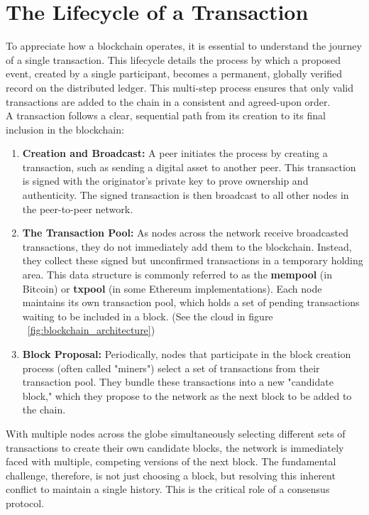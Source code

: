 \documentclass{scrbook}
\begin{document}
\chapter{The Lifecycle of a Transaction}

To appreciate how a blockchain operates, it is essential to understand the journey of a single transaction. This lifecycle details the process by which a proposed event, created by a single participant, becomes a permanent, globally verified record on the distributed ledger. This multi-step process ensures that only valid transactions are added to the chain in a consistent and agreed-upon order. \\


A transaction follows a clear, sequential path from its creation to its final inclusion in the blockchain:

\begin{enumerate}
    \item \textbf{Creation and Broadcast:} A peer initiates the process by creating a transaction, such as sending a digital asset to another peer. This transaction is signed with the originator's private key to prove ownership and authenticity. The signed transaction is then broadcast to all other nodes in the peer-to-peer network.
    
    \item \textbf{The Transaction Pool:} As nodes across the network receive broadcasted transactions, they do not immediately add them to the blockchain. Instead, they collect these signed but unconfirmed transactions in a temporary holding area. This data structure is commonly referred to as the \textbf{mempool} (in Bitcoin) or \textbf{txpool} (in some Ethereum implementations). Each node maintains its own transaction pool, which holds a set of pending transactions waiting to be included in a block. (See the cloud in figure ~\ref{fig:blockchain_architecture})
    
    \item \textbf{Block Proposal:} Periodically, nodes that participate in the block creation process (often called "miners") select a set of transactions from their transaction pool. They bundle these transactions into a new "candidate block," which they propose to the network as the next block to be added to the chain.
\end{enumerate}

With multiple nodes across the globe simultaneously selecting different sets of transactions to create their own candidate blocks, the network is immediately faced with multiple, competing versions of the next block. The fundamental challenge, therefore, is not just choosing a block, but resolving this inherent conflict to maintain a single history. This is the critical role of a consensus protocol.
\end{document}
